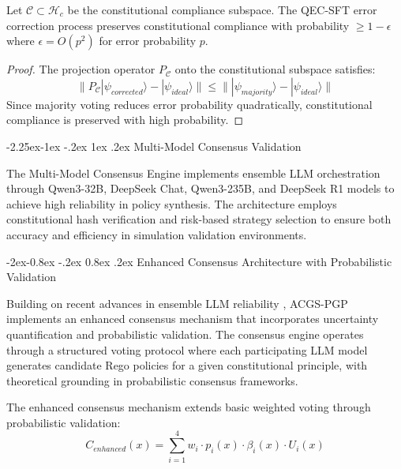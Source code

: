 \documentclass[manuscript,screen,9pt]{acmart}
\makeatletter
\renewcommand\subsection{\@startsection{subsection}{2}{\z@}%
  {-2.25ex\@plus -1ex \@minus -.2ex}%
  {1ex \@plus .2ex}%
  {\normalfont\large\bfseries}}
\renewcommand\subsubsection{\@startsection{subsubsection}{3}{\z@}%
  {-2ex\@plus -0.8ex \@minus -.2ex}%
  {0.8ex \@plus .2ex}%
  {\normalfont\normalsize\bfseries}}
\makeatother
\begin{document}
\begin{theorem}
	Let $\mathcal{C} \subset \mathcal{H}_c$ be the constitutional compliance subspace. The QEC-SFT error correction process preserves constitutional compliance with probability $\geq 1 - \epsilon$ where $\epsilon = O(p^2)$ for error probability $p$.
\end{theorem}

\begin{proof}
	The projection operator $P_{\mathcal{C}}$ onto the constitutional subspace satisfies:
	$$\|P_{\mathcal{C}}|\psi_{corrected}\rangle - |\psi_{ideal}\rangle\| \leq \||\psi_{majority}\rangle - |\psi_{ideal}\rangle\|$$
	Since majority voting reduces error probability quadratically, constitutional compliance is preserved with high probability.
\end{proof}

\subsection{Multi-Model Consensus Validation}
\label{subsec:multi_model_consensus}

The Multi-Model Consensus Engine implements ensemble LLM orchestration through Qwen3-32B, DeepSeek Chat, Qwen3-235B, and DeepSeek R1 models to achieve high reliability in policy synthesis. The architecture employs constitutional hash verification and risk-based strategy selection to ensure both accuracy and efficiency in simulation validation environments.

\subsubsection{Enhanced Consensus Architecture with Probabilistic Validation}
\label{subsubsec:enhanced_consensus}

Building on recent advances in ensemble LLM reliability \citep{Naik2024ProbabilisticConsensus}, ACGS-PGP implements an enhanced consensus mechanism that incorporates uncertainty quantification and probabilistic validation. The consensus engine operates through a structured voting protocol where each participating LLM model generates candidate Rego policies for a given constitutional principle, with theoretical grounding in probabilistic consensus frameworks.

The enhanced consensus mechanism extends basic weighted voting through probabilistic validation:
\begin{equation}
	C_{enhanced}(x) = \sum_{i=1}^{4} w_i \cdot p_i(x) \cdot \beta_i(x) \cdot U_i(x)
\end{equation}
\end{document}
